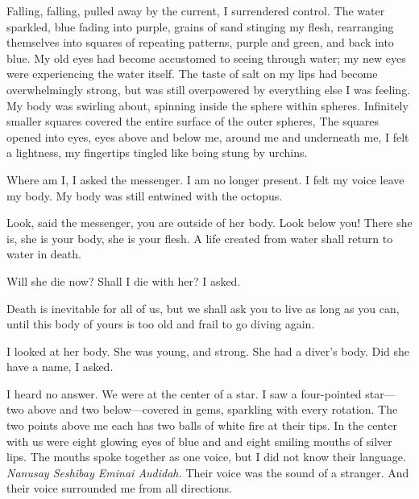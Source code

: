 \documentclass[12pt, letterpaper]{report}
\begin{document}
\vspace{1\baselineskip}
Falling, falling, pulled away by the current, I surrendered control. The water sparkled, blue fading into purple, grains of sand stinging my flesh, rearranging themselves into squares of repeating patterns, purple and green, and back into blue. My old eyes had become accustomed to seeing through water; my new eyes were experiencing the water itself. The taste of salt on my lips had become overwhelmingly strong, but was still overpowered by everything else I was feeling. My body was swirling about, spinning inside the sphere within spheres. Infinitely smaller squares covered the entire surface of the outer spheres, The squares opened into eyes, eyes above and below me, around me and underneath me, I felt a lightness, my fingertips tingled like being stung by urchins.

\vspace{1\baselineskip}
Where am I, I asked the messenger. I am no longer present. I felt my voice leave my body. My body was still entwined with the octopus.

\vspace{1\baselineskip}
Look, said the messenger, you are outside of her body. Look below you! There she is, she is your body, she is your flesh. A life created from water shall return to water in death. 

\vspace{1\baselineskip}
Will she die now? Shall I die with her? I asked.

\vspace{1\baselineskip}
Death is inevitable for all of us, but we shall ask you to live as long as you can, until this body of yours is too old and frail to go diving again.

\vspace{1\baselineskip}
I looked at her body. She was young, and strong. She had a diver's body. Did she have a name, I asked.

\vspace{1\baselineskip}
I heard no answer. We were at the center of a star. I saw a four-pointed star---two above and two below---covered in gems, sparkling with every rotation. The two points above me each has two balls of white fire at their tips. In the center with us were eight glowing eyes of blue and and eight smiling mouths of silver lips. The mouths spoke together as one voice, but I did not know their language. \textit{Nanusay Seshibay Eminai Audidah.} Their voice was the sound of a stranger. And their voice surrounded me from all directions.
\end{document}
